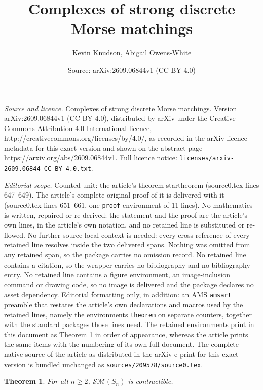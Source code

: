 \documentclass[10pt,a4paper]{amsart}
\title{Complexes of strong discrete Morse matchings}
\author{Kevin Knudson, Abigail Owens-White}
\date{Source: arXiv:2609.06844v1 (CC BY 4.0)}
\newtheorem{theorem}{Theorem}
\newcommand{\sm}{{\mathcal{SM}}}
\begin{document}
\maketitle

\noindent\emph{Source and licence.} Complexes of strong discrete Morse matchings. Version arXiv:2609.06844v1 (CC BY 4.0), distributed by arXiv under the Creative Commons Attribution 4.0 International licence, http://creativecommons.org/licenses/by/4.0/, as recorded in the arXiv licence metadata for this exact version and shown on the abstract page https://arxiv.org/abs/2609.06844v1. Full licence notice: \texttt{licenses/arxiv-2609.06844-CC-BY-4.0.txt}.\par\smallskip

\noindent\textit{Editorial scope.} Counted unit: the article's theorem startheorem (source0.tex lines 647--649). The article's complete original proof of it is delivered with it (source0.tex lines 651--661, one \texttt{proof} environment of 11 lines). No mathematics is written, repaired or re-derived: the statement and the proof are the article's own lines, in the article's own notation, and no retained line is substituted or re-flowed.  No further source-local context is needed: every cross-reference of every retained line resolves inside the two delivered spans.  Nothing was omitted from any retained span, so the package carries no omission record.  No retained line contains a citation, so the wrapper carries no bibliography and no bibliography entry.  No retained line contains a figure environment, an image-inclusion command or drawing code, so no image is delivered and the package declares no asset dependency.  Editorial formatting only, in addition: an AMS \texttt{amsart} preamble that restates the article's own declarations and macros used by the retained lines, namely the environments \texttt{theorem} on separate counters, together with the standard packages those lines need.  The retained environments print in this document as Theorem 1 in order of appearance, whereas the article prints the same items with the numbering of its own full document.  The complete native source of the article as distributed in the arXiv e-print for this exact version is bundled unchanged as \texttt{sources/209578/source0.tex}.
\begin{theorem}\label{startheorem}
    For all $n\ge 2$, $\sm(S_n)$ is contractible.
\end{theorem}
\end{document}

